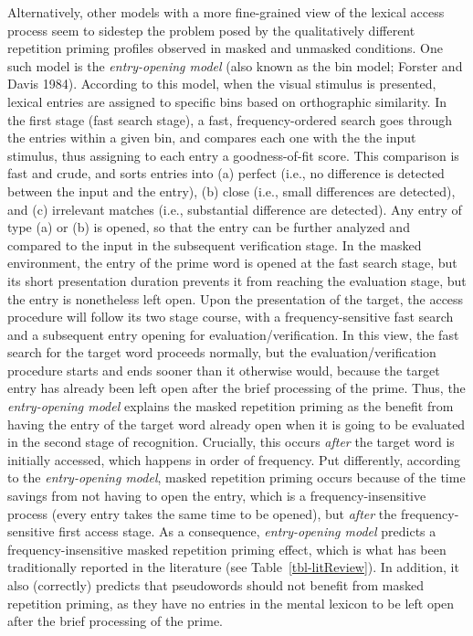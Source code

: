 \documentclass[
]{interact}
\begin{document}
Alternatively, other models with a more fine-grained view of the lexical
access process seem to sidestep the problem posed by the qualitatively
different repetition priming profiles observed in masked and unmasked
conditions. One such model is the \emph{entry-opening model} (also known
as the bin model; Forster and Davis 1984). According to this model, when
the visual stimulus is presented, lexical entries are assigned to
specific bins based on orthographic similarity. In the first stage (fast
search stage), a fast, frequency-ordered search goes through the entries
within a given bin, and compares each one with the the input stimulus,
thus assigning to each entry a goodness-of-fit score. This comparison is
fast and crude, and sorts entries into (a) perfect (i.e., no difference
is detected between the input and the entry), (b) close (i.e., small
differences are detected), and (c) irrelevant matches (i.e., substantial
difference are detected). Any entry of type (a) or (b) is opened, so
that the entry can be further analyzed and compared to the input in the
subsequent verification stage. In the masked environment, the entry of
the prime word is opened at the fast search stage, but its short
presentation duration prevents it from reaching the evaluation stage,
but the entry is nonetheless left open. Upon the presentation of the
target, the access procedure will follow its two stage course, with a
frequency-sensitive fast search and a subsequent entry opening for
evaluation/verification. In this view, the fast search for the target
word proceeds normally, but the evaluation/verification procedure starts
and ends sooner than it otherwise would, because the target entry has
already been left open after the brief processing of the prime. Thus,
the \emph{entry-opening model} explains the masked repetition priming as
the benefit from having the entry of the target word already open when
it is going to be evaluated in the second stage of recognition.
Crucially, this occurs \emph{after} the target word is initially
accessed, which happens in order of frequency. Put differently,
according to the \emph{entry-opening model}, masked repetition priming
occurs because of the time savings from not having to open the entry,
which is a frequency-insensitive process (every entry takes the same
time to be opened), but \emph{after} the frequency-sensitive first
access stage. As a consequence, \emph{entry-opening model} predicts a
frequency-insensitive masked repetition priming effect, which is what
has been traditionally reported in the literature (see
Table~\ref{tbl-litReview}). In addition, it also (correctly) predicts
that pseudowords should not benefit from masked repetition priming, as
they have no entries in the mental lexicon to be left open after the
brief processing of the prime.
\end{document}
